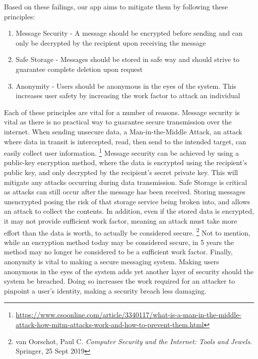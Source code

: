 \documentclass[titlepage]{article}
\begin{document}
    Based on these failings, our app aims to mitigate them by following these principles:
    \begin{enumerate}
        \item Message Security - A message should be encrypted before sending and can only be decrypted by the recipient upon receiving the message
        \item Safe Storage - Messages should be stored in safe way and should strive to guarantee complete deletion upon request
        \item Anonymity - Users should be anonymous in the eyes of the system. This increases user safety by increasing the work factor to attack an individual
    \end{enumerate}
    Each of these principles are vital for a number of reasons.
    Message security is vital as there is no practical way to guarantee secure transmission over the internet.
    When sending unsecure data, a Man-in-the-Middle Attack, an attack where data in transit is intercepted, read, then send to the intended target, can easily collect user information.
    \footnote{\url{https://www.csoonline.com/article/3340117/what-is-a-man-in-the-middle-attack-how-mitm-attacks-work-and-how-to-prevent-them.html}}
    Message security can be achieved by using a public-key encryption method, where the data is encrypted using the recipient's public key, and only decrypted by the recipient's secret private key.
    This will mitigate any attacks occurring during data transmission.
    Safe Storage is critical as attacks can still occur after the message has been received.
    Storing messages unencrypted posing the risk of that storage service being broken into, and allows an attack to collect the contents.
    In addition, even if the stored data is encrypted, it may not provide sufficient work factor, meaning an attack must take more effort than the data is worth, to actually be considered secure.
    \footnote{van Oorschot, Paul C. \textit{Computer Security and the Internet: Tools and Jewels}. Springer, 25 Sept 2019}
    Not to mention, while an encryption method today may be considered secure, in 5 years the method may no longer be considered to be a sufficient work factor.
    Finally, anonymity is vital to making a secure messaging system.
    Making users anonymous in the eyes of the system adds yet another layer of security should the system be breached.
    Doing so increases the work required for an attacker to pinpoint a user's identity, making a security breach less damaging.
\end{document}
